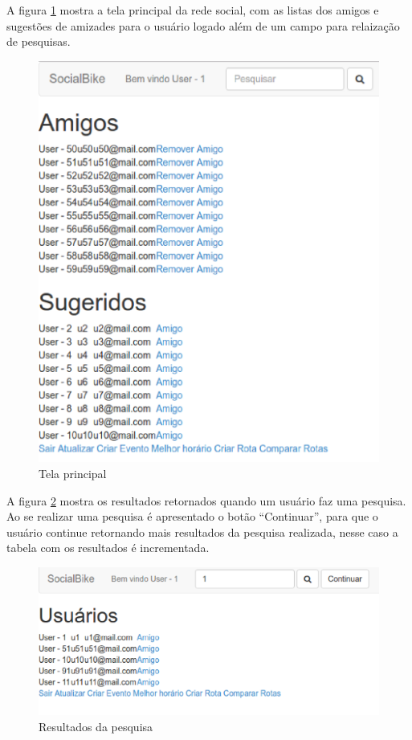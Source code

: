 A figura \ref{home} mostra a tela principal da rede social, com as listas dos amigos e sugestões de amizades para o usuário logado além de um campo para relaização de pesquisas.

\newpage
\begin{figure}[!h]
	\centering
	\includegraphics[scale=0.5]{figuras/resultados/home.eps}
	\caption[Tela principal]{Tela principal}
	\label{home}
\end{figure}

A figura \ref{pesquisa} mostra os resultados retornados quando um usuário faz uma pesquisa. Ao se realizar uma pesquisa é apresentado o botão ``Continuar'', para que o usuário continue retornando mais resultados da pesquisa realizada, nesse caso a tabela com os resultados é incrementada.

\begin{figure}[!h]
	\centering
	\includegraphics[scale=0.5]{figuras/resultados/pesquisa.eps}
	\caption[Resultados da pesquisa]{Resultados da pesquisa}
	\label{pesquisa}
\end{figure}

